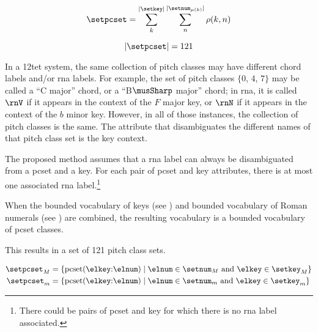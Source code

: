 
\begin{equation}
    \setpcset = \sum_{k}^{| \setkey |} \sum_{n}^{| \setnum_{\mu(k)} |} \rho(k, n)
\end{equation}

\begin{equation}
    | \setpcset | = 121
\end{equation}

In a \gls{12tet} system, the same collection of pitch
classes may have different chord labels and/or \gls{rna}
labels. For example, the set of pitch classes $\{0$, $4$,
$7\}$ may be called a ``C major'' chord, or a ``B$\musSharp$
major'' chord; in \gls{rna}, it is called $\rnV$ if it
appears in the context of the $F$ major key, or $\rnN$ if it
appears in the context of the $b$ minor key. However, in all
of those instances, the collection of pitch classes is the
same. The attribute that disambiguates the different names
of that pitch class set is the key context.

The proposed method assumes that a \gls{rna} label can
always be disambiguated from a \gls{pcset} and a key. For
each pair of \gls{pcset} and key attributes, there is at
most one associated \gls{rna} label.\footnote{There could be
pairs of \gls{pcset} and key for which there is no \gls{rna}
label associated.}

When the bounded vocabulary of keys (see
) and bounded vocabulary
of Roman numerals (see
) are combined, the
resulting vocabulary is a bounded vocabulary of \gls{pcset}
classes.

This results in a set of 121 pitch class sets.

\begin{equation}
    \begin{split}
    \setpcset_M &= \{ \text{pcset}(\elkey\text{:}\elnum) \mid 
    \elnum \in \setnum_M \text{ and } \elkey \in \setkey_M \} \\
    \setpcset_m &= \{ \text{pcset}(\elkey\text{:}\elnum) \mid 
    \elnum \in \setnum_m \text{ and } \elkey \in \setkey_m \} \\    
    \end{split}
\end{equation}

